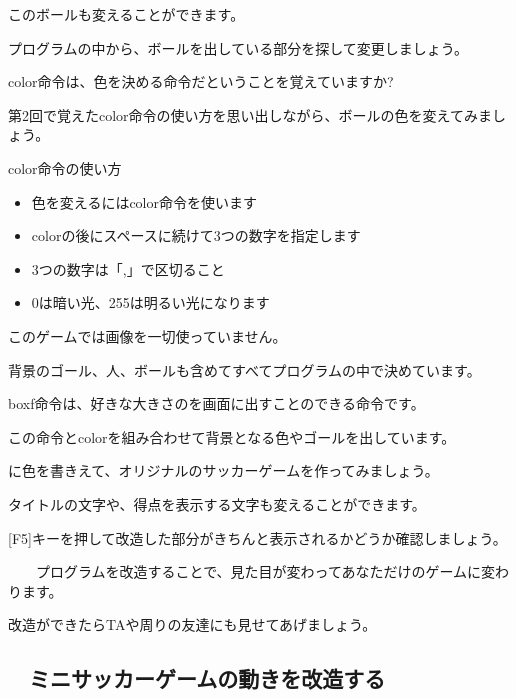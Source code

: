 \documentclass[text04.tex]{subfiles}
\begin{document}
このボールも変えることができます。

プログラムの中から、ボールを出している部分を探して変更しましょう。



color命令は、色を決める命令だということを覚えていますか?

第2回で覚えたcolor命令の使い方を思い出しながら、ボールの色を変えてみましょう。

\begin{itembox}[c]{color命令の使い方}
    \begin{itemize}
        \item 色を変えるにはcolor命令を使います
        \item colorの後にスペースに続けて3つの数字を指定します
        \item 3つの数字は「,」で区切ること
        \item 0は暗い光、255は明るい光になります
    \end{itemize}
\end{itembox}

このゲームでは画像を一切使っていません。

背景のゴール、人、ボールも含めてすべてプログラムの中で決めています。

boxf命令は、好きな大きさのを画面に出すことのできる命令です。

この命令とcolorを組み合わせて背景となる色やゴールを出しています。



に色を書きえて、オリジナルのサッカーゲームを作ってみましょう。

タイトルの文字や、得点を表示する文字も変えることができます。




\exampleanswer


[F5]キーを押して改造した部分がきちんと表示されるかどうか確認しましょう。

\ \ \ \ プログラムを改造することで、見た目が変わってあなただけのゲームに変わります。

改造ができたらTAや周りの友達にも見せてあげましょう。
\newpage
\subsection{\useOmetoiExample　ミニサッカーゲームの動きを改造する}

\exampleinduction
\end{document}
